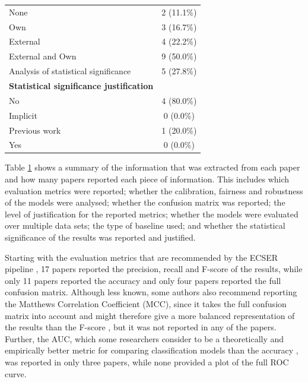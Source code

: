 \documentclass[a4paper]{article}
\begin{document}
\begin{table}[H]
\begin{tabularx}{0.7\textwidth}{|X|c|}
		\hspace{3mm} None & 2 (11.1\%) \\
		\hspace{3mm} Own & 3 (16.7\%) \\
		\hspace{3mm} External & 4 (22.2\%)\\
		\hspace{3mm} External and Own & 9 (50.0\%) \\
		Analysis of statistical significance & 5 (27.8\%) \\
		\textbf{Statistical significance justification}&\\
		\hspace{3mm} No & 4 (80.0\%)  \\
		\hspace{3mm} Implicit & 0 (0.0\%) \\
		\hspace{3mm} Previous work & 1 (20.0\%) \\
		\hspace{3mm} Yes & 0 (0.0\%)  \\
		\hline
	\end{tabularx}
	\label{table:mapping_results}
\end{table}

Table \ref{table:mapping_results} shows a summary of the information that was extracted from each paper and how many papers reported each piece of information. This includes which evaluation metrics were reported; whether the calibration, fairness and robustness of the models were analysed; whether the confusion matrix was reported; the level of justification for the reported metrics; whether the models were evaluated over multiple data sets; the type of baseline used; and whether the statistical significance of the results was reported and justified.

Starting with the evaluation metrics that are recommended by the ECSER pipeline \cite{Dellanna2022}, 17 papers reported the precision, recall and F-score of the results, while only 11 papers reported the accuracy and only four papers reported the full confusion matrix. Although less known, some authors also recommend reporting the Matthews Correlation Coefficient (MCC), since it takes the full confusion matrix into account and might therefore give a more balanced representation of the results than the F-score \cite{Chicco2020}, but it was not reported in any of the papers. Further, the AUC, which some researchers consider to be a theoretically and empirically better metric for comparing classification models than the accuracy \cite{huang2005auc,ling2003auc}, was reported in only three papers, while none provided a plot of the full ROC curve.
\end{document}
